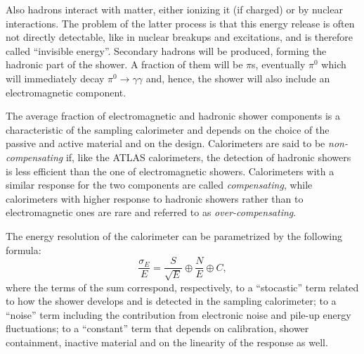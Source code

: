 Also hadrons interact with matter, either ionizing it (if charged) or by nuclear interactions.
The problem of the latter process is that this energy release is often not directly detectable,
like in nuclear breakups and excitations, and is therefore called ``invisible energy''.
Secondary hadrons will be produced, forming the hadronic part of the shower.
A fraction of them will be $\pi$s, eventually 
$\pi^0$ which will immediately decay $\pi^0\to \gamma\gamma$ 
and, hence, the shower will also include an
electromagnetic component.

The average fraction of electromagnetic and hadronic shower components is a characteristic
of the sampling calorimeter and depends on the choice of the passive and active material
and on the design. Calorimeters are said to be {\it non-compensating} if, like the ATLAS
calorimeters, the detection of hadronic showers is less efficient than the one of 
electromagnetic showers. Calorimeters with a similar response for the two components
are called  {\it compensating}, while calorimeters with higher response to
hadronic showers rather than to electromagnetic ones 
are rare and referred to as {\it over-compensating}.


The energy resolution of the calorimeter can be 
parametrized by the following formula:
\begin{equation}\label{eq:resolution}
\frac{\sigma_{E}}{E} = \frac{S}{\sqrt{E}}\oplus\frac{N}{E}\oplus C,
\end{equation} 
where the terms of the sum correspond, 
respectively, to a ``stocastic'' term 
related to how the shower develops and is detected 
in the sampling calorimeter; to a ``noise''
term including the contribution from electronic noise and pile-up energy fluctuations; 
to a ``constant'' term that depends on calibration, shower containment, inactive material and on the
linearity of the response as well. 


